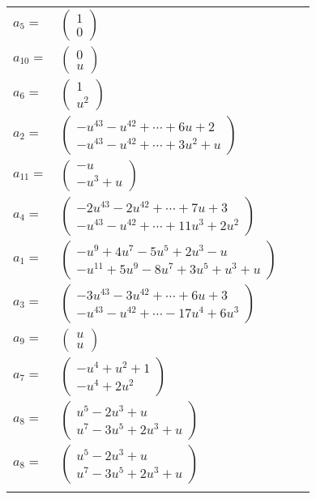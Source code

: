 \documentclass[1p]{elsarticle_modified}
\theoremstyle{definition}
\begin{document}
\begin{tabular}{m{7pt} m{180pt} m{7pt} m{180pt} }
\flushright $a_{5}=$&$\begin{pmatrix}1\\0\end{pmatrix}$ \\
\flushright $a_{10}=$&$\begin{pmatrix}0\\u\end{pmatrix}$ \\
\flushright $a_{6}=$&$\begin{pmatrix}1\\u^2\end{pmatrix}$ \\
\flushright $a_{2}=$&$\begin{pmatrix}- u^{43}- u^{42}+\cdots+6 u+2\\- u^{43}- u^{42}+\cdots+3 u^2+u\end{pmatrix}$ \\
\flushright $a_{11}=$&$\begin{pmatrix}- u\\- u^3+u\end{pmatrix}$ \\
\flushright $a_{4}=$&$\begin{pmatrix}-2 u^{43}-2 u^{42}+\cdots+7 u+3\\- u^{43}- u^{42}+\cdots+11 u^3+2 u^2\end{pmatrix}$ \\
\flushright $a_{1}=$&$\begin{pmatrix}- u^9+4 u^7-5 u^5+2 u^3- u\\- u^{11}+5 u^9-8 u^7+3 u^5+u^3+u\end{pmatrix}$ \\
\flushright $a_{3}=$&$\begin{pmatrix}-3 u^{43}-3 u^{42}+\cdots+6 u+3\\- u^{43}- u^{42}+\cdots-17 u^4+6 u^3\end{pmatrix}$ \\
\flushright $a_{9}=$&$\begin{pmatrix}u\\u\end{pmatrix}$ \\
\flushright $a_{7}=$&$\begin{pmatrix}- u^4+u^2+1\\- u^4+2 u^2\end{pmatrix}$ \\
\flushright $a_{8}=$&$\begin{pmatrix}u^5-2 u^3+u\\u^7-3 u^5+2 u^3+u\end{pmatrix}$\\ \flushright $a_{8}=$&$\begin{pmatrix}u^5-2 u^3+u\\u^7-3 u^5+2 u^3+u\end{pmatrix}$\\&\end{tabular}
\end{document}
